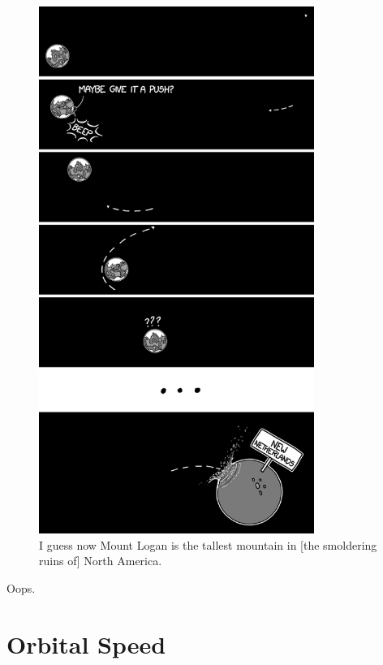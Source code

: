 {\begin{figure}[!htbp]
\centering
\includegraphics[scale=0.5, max width=0.8\textwidth]{imgs/a/57/mountain_higher.png}
\caption{I guess now Mount Logan is the tallest mountain in [the smoldering ruins of] North America.}
\end{figure}

{Oops.}

{
\chapter{Orbital Speed}
}

}

